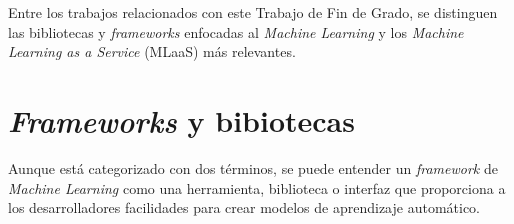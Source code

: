 
Entre los trabajos relacionados con este Trabajo de Fin de Grado, se distinguen las bibliotecas y \textit{frameworks} enfocadas al \textit{Machine Learning} y los \textit{Machine Learning as a Service} (MLaaS) más relevantes.

\section{\textit{Frameworks} y bibiotecas}\label{related:frameworks}
Aunque está categorizado con dos términos, se puede entender un \textit{framework} de \textit{Machine Learning} como una herramienta, biblioteca o interfaz que proporciona a los desarrolladores facilidades para crear modelos de aprendizaje automático.


